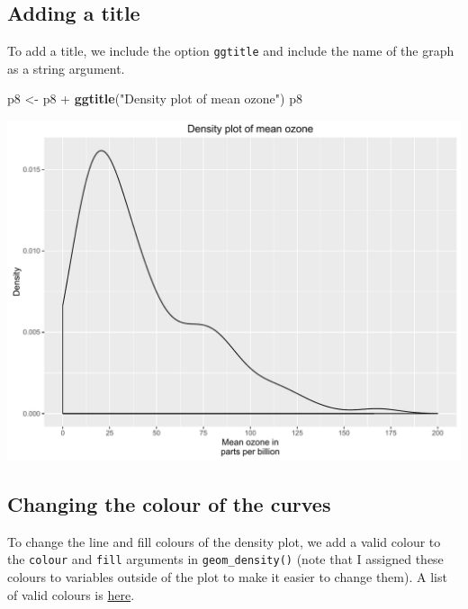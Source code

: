 \documentclass[]{article}
\newenvironment{Shaded}{\begin{snugshade}}{\end{snugshade}}
\newcommand{\KeywordTok}[1]{\textcolor[rgb]{0.13,0.29,0.53}{\textbf{{#1}}}}
\newcommand{\StringTok}[1]{\textcolor[rgb]{0.31,0.60,0.02}{{#1}}}
\newcommand{\NormalTok}[1]{{#1}}
\begin{document}
\subsection{Adding a title}\label{adding-a-title-1}

To add a title, we include the option \texttt{ggtitle} and include the
name of the graph as a string argument.

\begin{Shaded}
\begin{Highlighting}[]
\NormalTok{p8 <-}\StringTok{ }\NormalTok{p8 +}\StringTok{ }\KeywordTok{ggtitle}\NormalTok{(}\StringTok{"Density plot of mean ozone"}\NormalTok{)}
\NormalTok{p8}
\end{Highlighting}
\end{Shaded}

\begin{center}\includegraphics{0_all_posts_pdf/density_5-1} \end{center}

\subsection{Changing the colour of the
curves}\label{changing-the-colour-of-the-curves}

To change the line and fill colours of the density plot, we add a valid
colour to the \texttt{colour} and \texttt{fill} arguments in
\texttt{geom\_density()} (note that I assigned these colours to
variables outside of the plot to make it easier to change them). A list
of valid colours is
\href{http://www.stat.columbia.edu/~tzheng/files/Rcolor.pdf}{here}.
\end{document}
